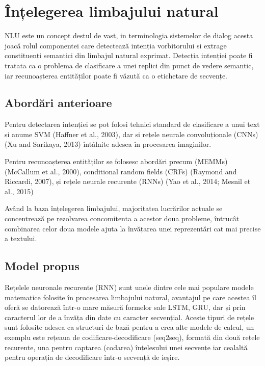\section{Înțelegerea limbajului natural}
NLU este un concept destul de vast, in terminologia sistemelor de dialog acesta joacă rolul componentei care detectează intenția vorbitorului si extrage constituenți semantici din limbajul natural exprimat.
Detecția intenției poate fi tratata ca o problema de clasificare a unei replici din punct de vedere semantic, iar recunoașterea entităților poate fi văzută ca o etichetare de secvențe.
\subsection{Abordări anterioare}


Pentru detectarea intenției se pot folosi tehnici standard de clasificare a unui text si anume SVM (Haffner et al., 2003), dar si rețele neurale convoluționale (CNNs) (Xu and Sarikaya, 2013) întâlnite adesea în procesarea imaginilor.

Pentru recunoașterea entităților se folosesc abordări precum (MEMMs) (McCallum et al., 2000), conditional random fields (CRFs) (Raymond and Riccardi, 2007), și rețele neurale recurente (RNNs) (Yao et al., 2014; Mesnil et al., 2015)

Având la baza înțelegerea limbajului, majoritatea lucrărilor actuale se concentrează pe rezolvarea concomitenta a acestor doua probleme, întrucât combinarea celor doua modele ajuta la învățarea unei reprezentări cat mai precise a textului. \cite{joint models-attention models}


\subsection{Model propus}

Rețelele neuronale recurente (RNN) sunt unele dintre cele mai populare modele matematice folosite în procesarea limbajului natural, avantajul pe care acestea îl oferă se datorează într-o mare măsură formelor sale LSTM, GRU, dar și prin caracterul lor de a învăța din date cu caracter secvențial. Aceste tipuri de rețele sunt folosite adesea ca structuri de bază pentru a crea alte modele de calcul, un exemplu este rețeaua de codificare-decodificare (seq2seq), formată din două rețele recurente, una pentru captarea (codarea) înțelesului unei secvențe iar cealaltă pentru operația de decodificare într-o secvență de ieșire.

